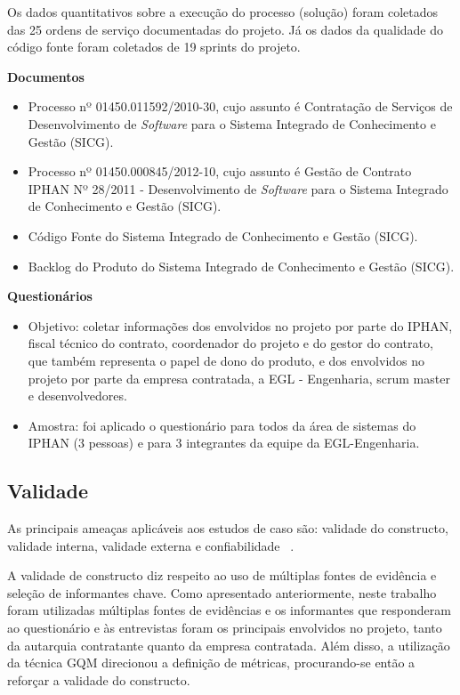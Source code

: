 Os dados quantitativos sobre a execução do processo (solução) foram coletados das 25 ordens de serviço documentadas do projeto. Já os dados da qualidade do código fonte foram coletados de 19 sprints do projeto.

\textbf{Documentos}
\begin{itemize}
\item Processo nº 01450.011592/2010-30, cujo assunto é Contratação de Serviços de Desenvolvimento de \textit{Software} para o Sistema Integrado de Conhecimento e Gestão (SICG). 
\item Processo nº 01450.000845/2012-10, cujo assunto é Gestão de Contrato IPHAN Nº 28/2011 - Desenvolvimento de \textit{Software} para o Sistema Integrado de Conhecimento e Gestão (SICG). 
\item Código Fonte do Sistema Integrado de Conhecimento e Gestão (SICG).
\item Backlog do Produto do Sistema Integrado de Conhecimento e Gestão (SICG).
\end{itemize}

\textbf{Questionários}
\begin{itemize}
\item Objetivo: coletar informações dos envolvidos no projeto por parte do IPHAN,  fiscal técnico do contrato, coordenador do projeto e do gestor do contrato, que também representa o papel de dono do produto, e dos envolvidos no projeto por parte da empresa contratada, a EGL - Engenharia, scrum master e desenvolvedores. 
\item Amostra: foi aplicado o questionário para todos da área de sistemas do IPHAN (3 pessoas) e para 3 integrantes da equipe da EGL-Engenharia.
\end{itemize}

\subsection[Validade]{Validade}

As principais ameaças aplicáveis aos estudos de caso 
são: validade do constructo, validade interna, validade externa e confiabilidade ~\cite{yin}.

A validade de constructo diz respeito ao uso de múltiplas fontes de evidência e seleção de informantes chave. Como apresentado anteriormente, neste trabalho foram utilizadas múltiplas fontes de evidências e os informantes que responderam ao questionário e às entrevistas foram os principais envolvidos no projeto, tanto da autarquia contratante quanto da empresa contratada. Além disso, a utilização da técnica GQM direcionou a definição de métricas, procurando-se então a reforçar a validade do constructo.

